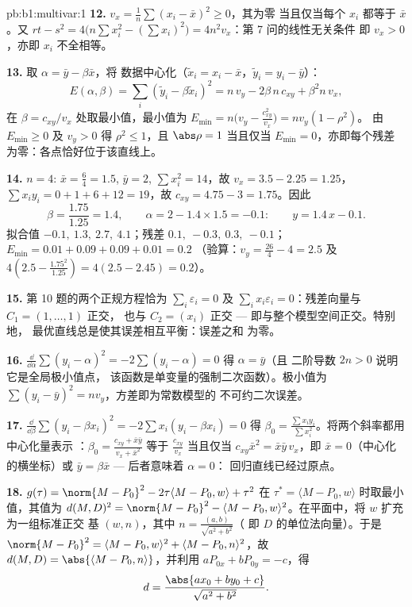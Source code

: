 \begin{solution}{pb:b1:multivar:1}
\textbf{12.} $v_x = \frac1n\sum(x_i - \bar x)^2 \geq 0$，其为零
当且仅当每个 $x_i$ 都等于 $\bar x$。又 $rt - s^2 = 4\bigl(n\sum
x_i^2 - (\sum x_i)^2\bigr) = 4n^2 v_x$：第 7 问的线性无关条件
即 $v_x > 0$，亦即 $x_i$ 不全相等。

\textbf{13.} 取 $\alpha = \bar y - \beta\bar x$，将
数据中心化（$\tilde x_i = x_i - \bar x$，$\tilde y_i = y_i - \bar y$）：
\[
E(\alpha, \beta) = \sum_i(\tilde y_i - \beta\tilde x_i)^2
= n\,v_y - 2\beta\,n\,c_{xy} + \beta^2 n\,v_x ,
\]
在 $\beta = c_{xy}/v_x$ 处取最小值，最小值为 $E_{\min} =
n\bigl(v_y - \frac{c_{xy}^2}{v_x}\bigr) = n v_y(1 - \rho^2)$。
由 $E_{\min} \geq 0$ 及 $v_y > 0$ 得 $\rho^2 \leq 1$，且
$\abs\rho = 1$ 当且仅当 $E_{\min} = 0$，亦即每个残差
为零：各点恰好位于该直线上。

\textbf{14.} $n = 4$: $\bar x = \frac64 = 1.5$, $\bar y = 2$,
$\sum x_i^2 = 14$，故 $v_x = 3.5 - 2.25 = 1.25$，$\sum x_iy_i =
0 + 1 + 6 + 12 = 19$，故 $c_{xy} = 4.75 - 3 = 1.75$。因此
\[
\beta = \frac{1.75}{1.25} = 1.4,
\qquad
\alpha = 2 - 1.4\times1.5 = -0.1 :
\qquad y = 1.4\,x - 0.1 .
\]
拟合值 $-0.1,\ 1.3,\ 2.7,\ 4.1$；残差 $0.1,\ -0.3,\
0.3,\ -0.1$；$E_{\min} = 0.01 + 0.09 + 0.09 + 0.01 = 0.2$
（验算：$v_y = \frac{26}4 - 4 = 2.5$ 及 $4(2.5 -
\frac{1.75^2}{1.25}) = 4(2.5 - 2.45) = 0.2$）。

\textbf{15.} 第 10 题的两个正规方程恰为
$\sum_i\varepsilon_i = 0$ 及 $\sum_i x_i\varepsilon_i =
0$：残差向量与 $C_1 = (1, \dots, 1)$ 正交，
也与 $C_2 = (x_i)$ 正交 --- 即与整个模型空间正交。特别地，
最优直线总是使其误差相互平衡：误差之和
为零。

\textbf{16.} $\frac{\dd}{\dd\alpha}\sum(y_i - \alpha)^2 =
-2\sum(y_i - \alpha) = 0$ 得 $\alpha = \bar y$（且
二阶导数 $2n > 0$ 说明它是全局极小值点，
该函数是单变量的强制二次函数）。极小值为
$\sum(y_i - \bar y)^2 = n v_y$，方差即为常数模型的
不可约二次误差。

\textbf{17.} $\frac{\dd}{\dd\beta}\sum(y_i - \beta x_i)^2 =
-2\sum x_i(y_i - \beta x_i) = 0$ 得 $\beta_0 = \frac{\sum
x_iy_i}{\sum x_i^2}$。将两个斜率都用中心化量表示
：$\beta_0 = \frac{c_{xy} + \bar x\bar y}{v_x + \bar
x^2}$ 等于 $\frac{c_{xy}}{v_x}$ 当且仅当 $c_{xy}\bar x^2 = \bar
x\bar y\,v_x$，即 $\bar x = 0$（中心化的横坐标）或
$\bar y = \beta\bar x$ --- 后者意味着 $\alpha = 0$：
回归直线已经过原点。

\textbf{18.} $g(\tau) = \norm{M - P_0}^2 - 2\tau\langle M - P_0,
w\rangle + \tau^2$ 在 $\tau^* = \langle M - P_0,
w\rangle$ 时取最小值，其值为 $d(M,D)^2 = \norm{M - P_0}^2 - \langle M -
P_0, w\rangle^2$。在平面中，将 $w$ 扩充为一组标准正交
基 $(w, n)$，其中 $n = \frac{(a, b)}{\sqrt{a^2+b^2}}$（
即 $D$ 的单位法向量）。于是 $\norm{M - P_0}^2 = \langle M - P_0,
w\rangle^2 + \langle M - P_0, n\rangle^2$，故 $d(M, D) =
\abs{\langle M - P_0, n\rangle}$，并利用 $aP_{0x} + bP_{0y} =
-c$，得
\[
d = \frac{\abs{a x_0 + b y_0 + c}}{\sqrt{a^2 + b^2}} .
\]


\end{solution}
